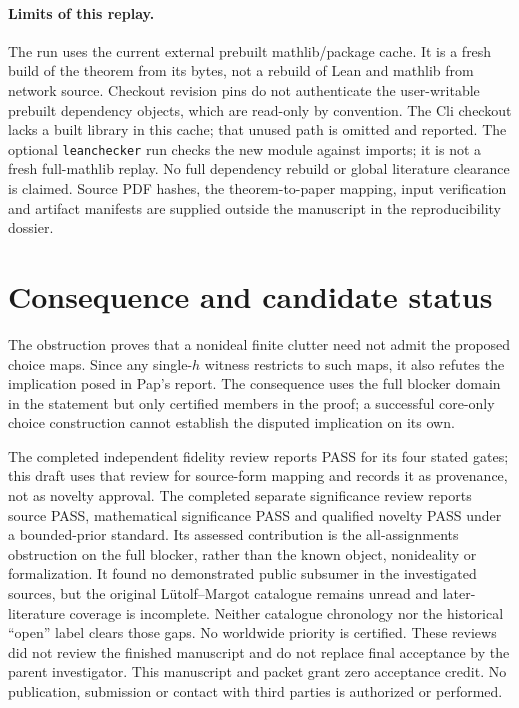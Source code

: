 \documentclass[11pt]{article}
\begin{document}
\paragraph{Limits of this replay.}
The run uses the current external prebuilt mathlib/package cache. It is a fresh build of the theorem from its bytes, not a rebuild of Lean and mathlib from network source. Checkout revision pins do not authenticate the user-writable prebuilt dependency objects, which are read-only by convention. The Cli checkout lacks a built library in this cache; that unused path is omitted and reported. The optional \texttt{leanchecker} run checks the new module against imports; it is not a fresh full-mathlib replay. No full dependency rebuild or global literature clearance is claimed. Source PDF hashes, the theorem-to-paper mapping, input verification and artifact manifests are supplied outside the manuscript in the reproducibility dossier.

\section{Consequence and candidate status}
The obstruction proves that a nonideal finite clutter need not admit the proposed choice maps. Since any single-$h$ witness restricts to such maps, it also refutes the implication posed in Pap's report. The consequence uses the full blocker domain in the statement but only certified members in the proof; a successful core-only choice construction cannot establish the disputed implication on its own.

The completed independent fidelity review \cite{Fidelity} reports PASS for its four stated gates; this draft uses that review for source-form mapping and records it as provenance, not as novelty approval. The completed separate significance review \cite{Significance} reports source PASS, mathematical significance PASS and qualified novelty PASS under a bounded-prior standard. Its assessed contribution is the all-assignments obstruction on the full blocker, rather than the known object, nonideality or formalization. It found no demonstrated public subsumer in the investigated sources, but the original L\"utolf--Margot catalogue remains unread and later-literature coverage is incomplete. Neither catalogue chronology nor the historical ``open'' label clears those gaps. No worldwide priority is certified. These reviews did not review the finished manuscript and do not replace final acceptance by the parent investigator. This manuscript and packet grant zero acceptance credit. No publication, submission or contact with third parties is authorized or performed.
\end{document}
